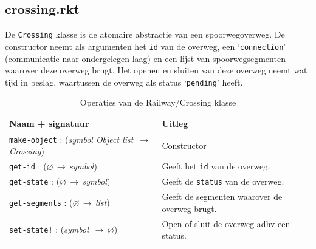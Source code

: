 \documentclass[a4paper, 11pt]{article}
\newcommand{\naar}{\,$\rightarrow$\,}
\renewcommand{\empty}{$\varnothing$}
\newcommand{\<}{\scriptsize\textless\normalsize}
\renewcommand{\>}{\scriptsize\textgreater\normalsize}
\begin{document}
\subsection{crossing.rkt} %
De \texttt{Crossing} klasse is de atomaire abstractie van een spoorwegoverweg. De constructor neemt als argumenten het \texttt{id} van de overweg, een \lq\texttt{connection}' (communicatie naar ondergelegen laag) en een lijst van spoorwegsegmenten waarover deze overweg brugt. Het openen en sluiten van deze overweg neemt wat tijd in beslag, waartussen de overweg als status \lq\texttt{pending}' heeft.
\begin{table}[H]
	\begin{center}
		{
		\begin{tabular}{|l l|}
			\hline
			\textbf{Naam + signatuur} & \textbf{Uitleg}\\
			\hline
			\texttt{make-object} : (\textit{symbol Object list} \naar \textit{Crossing}) & Constructor\\
			\hline
			\texttt{get-id} : (\empty \naar \textit{symbol}) & Geeft het \texttt{id} van de overweg.\\
			\texttt{get-state} : (\empty \naar \textit{symbol}) & Geeft de \texttt{status} van de overweg.\\
			\texttt{get-segments} : (\empty \naar \textit{list}) & Geeft de segmenten waarover de overweg brugt.\\
			\texttt{set-state!} : (\textit{symbol} \naar \empty) & Open of sluit de overweg adhv een status.\\
			\hline
		\end{tabular}}
		\caption{Operaties van de Railway/Crossing klasse}
	\end{center}
\end{table}

\end{document}
